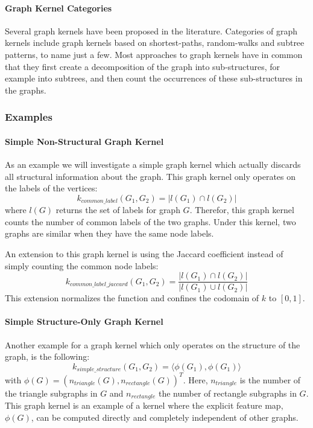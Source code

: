 \paragraph{Graph Kernel Categories}
Several graph kernels have been proposed in the literature.
Categories of graph kernels include graph kernels based on shortest-paths, random-walks and subtree patterns, to name just a few.
Most approaches to graph kernels have in common that they first create a decomposition of the graph into sub-structures, for example into subtrees, and then count the occurrences of these sub-structures in the graphs.


\subsubsection{Examples}
\paragraph{Simple Non-Structural Graph Kernel}
As an example we will investigate a simple graph kernel which actually discards all structural information about the graph. This graph kernel only operates on the labels of the vertices:
\begin{equation*}
k_{common\_label}(G_1, G_2) = | l(G_1) \cap l(G_2) |
\end{equation*}
where $l(G)$ returns the set of labels for graph $G$.
Therefor, this graph kernel counts the number of common labels of the two graphs. Under this kernel, two graphs are similar when they have the same node labels.

An extension to this graph kernel is using the Jaccard coefficient instead of simply counting the common node labels:
\begin{equation*}
k_{common\_label\_jaccard}(G_1, G_2) = \frac{| l(G_1) \cap l(G_2) |}{| l(G_1) \cup l(G_2) |}
\end{equation*}
This extension normalizes the function and confines the codomain of $k$ to $[0, 1]$.


\paragraph{Simple Structure-Only Graph Kernel}
Another example for a graph kernel which only operates on the structure of the graph, is the following:
\begin{equation*}
k_{simple\_structure}(G_1, G_2) = \langle \phi(G_1), \phi(G_1) \rangle
\end{equation*}
with $\phi(G) = (n_{triangle}(G), n_{rectangle}(G))^T$. Here, $n_{triangle}$ is the number of the triangle subgraphs in $G$ and $n_{rectangle}$ the number of rectangle subgraphs in $G$.
This graph kernel is an example of a kernel where the explicit feature map, $\phi(G)$, can be computed directly and completely independent of other graphs.

